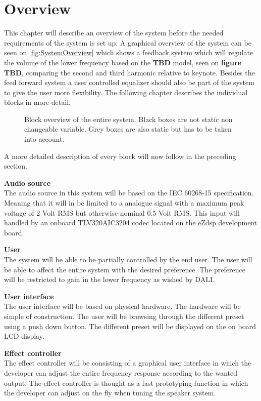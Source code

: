 \chapter{Overview} \label{ch:overview}
This chapter will describe an overview of the system before the needed requirements of the system is set up. A graphical overview of the system can be seen on \autoref{fig:SystemOverview} which shows a feedback system which will regulate the volume of the lower frequency based on the \textbf{TBD} model, seen on \textbf{figure TBD}, comparing the second and third harmonic relative to keynote. Besides the feed forward system a user controlled equalizer should also be part of the system to give the user more flexibility. The following chapter describes the individual blocks in more detail.          

\begin{figure}[H]
\centering
{}
\scalebox{0.8}{
}
\caption{Block overview of the entire system. Black boxes are not static non changeable variable. Grey boxes are also static but has to be taken into account.}
\label{fig:SystemOverview}
\end{figure}
A more detailed description of every block will now follow in the preceding section.

\textbf{Audio source} \\
The audio source in this system will be based on the IEC 60268-15 specification. Meaning that it will in be limited to a analogue signal with a maximum peak voltage of 2 Volt RMS but otherwise nominal 0.5 Volt RMS. This input will handled by an onboard TLV320AIC3204 codec located on the eZdsp development board.

\textbf{User} \\
The system will be able to be partially controlled by the end user. The user will be able to affect the entire system with the desired preference. The preference will be restricted to gain in the lower frequency as wished by DALI.

\textbf{User interface}\\
The user interface will be based on physical hardware. The hardware will be simple of construction. The user will be browsing through the different preset using a push down button. The different preset will be displayed on the on board LCD display.

\textbf{Effect controller} \\
The effect controller will be consisting of a graphical user interface in which the developer can adjust the entire frequency response according to the wanted output. The effect controller is thought as a fast prototyping function in which the developer can adjust on the fly when tuning the speaker system.

